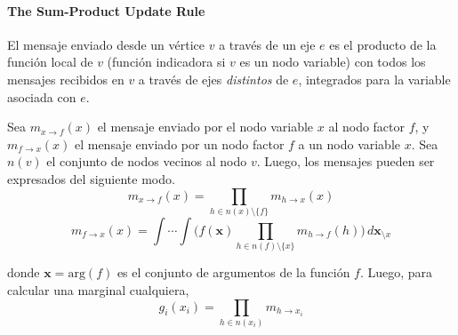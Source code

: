 \documentclass[article]{jss}
\newif\ifen
\newcommand{\en}[1]{\ifen#1\fi}
\begin{document}
%
\en{}
\en{Para calcular la posterior utilizamos un algoritmo gen\'erico de pasaje de mensajes para \emph{factor graphs} llamado \emph{sum-product algorithm}~\cite{Kschischang2001}.}
%
\en{}
\en{Permite resolver funciones marginales eficientemente mediante el uso de la forma en la cual la funci\'on global se factoriza en el producto de funciones locales simples, cada una dependiente de una subconjunto de variables.}
%
\en{}
\en{Un \emph{factor graph} es una grafo bipartito, (relaciones entre nodos variable $v$ y nodos factor $f$).
Los ejes del factor graph representan la relaci\'on matem\'atica ``nodo $v$ es argumento de nodo $f$''.
La estructura del grafo codifica la factorizaci\'on de la funci\'on global.
Pero adem\'as, cuando un grafo de factorizaci\'on (\emph{factor graph}) no contiene ciclos, el grafo codifica tambi\'en las expresiones aritm\'eticas mediante las cuales se puede computar las marginales asociadas a la funci\'on global.
}

\paragraph{The Sum-Product Update Rule} El mensaje enviado desde un v\'ertice $v$ a trav\'es de un eje $e$ es el producto de la funci\'on local de $v$ (funci\'on indicadora si $v$ es un nodo variable) con todos los mensajes recibidos en $v$ a trav\'es de ejes \emph{distintos} de $e$, integrados para la variable asociada con $e$.

\vspace{0.3cm}

Sea $m_{x \rightarrow f}(x)$ el mensaje enviado por el nodo variable $x$ al nodo factor $f$, y $m_{f \rightarrow x}(x)$ el mensaje enviado por un nodo factor $f$ a un nodo variable $x$.
Sea $n(v)$ el conjunto de nodos vecinos al nodo $v$.
Luego, los mensajes pueden ser expresados del siguiente modo.
\begin{equation}\label{eq:m_v_f} 
m_{x \rightarrow f}(x) = \prod_{h \in n(x) \setminus \{f\} } m_{h \rightarrow x}(x)
\end{equation}
\begin{equation}\label{eq:m_f_v}  
m_{f \rightarrow x}(x) = \int \cdots \int \Big( f(\bm{x}) \prod_{h \in n(f) \setminus \{x\} } m_{h \rightarrow f}(h) \Big) \,  d\bm{x}_{\setminus x}
\end{equation}

donde $\bm{x} = \text{arg}(f)$ es el conjunto de argumentos de la funci\'on $f$. 
Luego, para calcular una marginal cualquiera,
\begin{equation}\label{eq:marginal}
g_i(x_i) = \prod_{h \in n(x_i)} m_{h \rightarrow x_i}
\end{equation}
\end{document}
